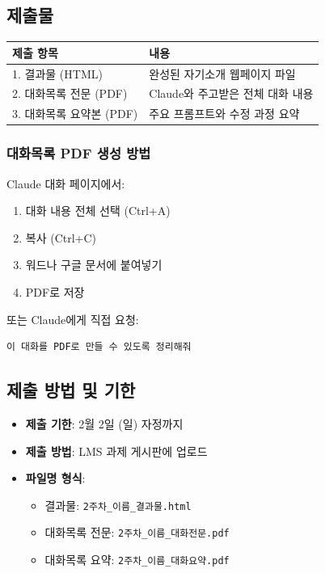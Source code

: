 \documentclass[11pt, a4paper]{article}
\begin{document}
\subsection{제출물}

\begin{table}[H]
\centering
\begin{tabularx}{\textwidth}{|l|X|}
\hline
\rowcolor{lightgray}
\textbf{제출 항목} & \textbf{내용} \\
\hline
1. 결과물 (HTML) & 완성된 자기소개 웹페이지 파일 \\
\hline
2. 대화목록 전문 (PDF) & Claude와 주고받은 전체 대화 내용 \\
\hline
3. 대화목록 요약본 (PDF) & 주요 프롬프트와 수정 과정 요약 \\
\hline
\end{tabularx}
\end{table}

\subsubsection{대화목록 PDF 생성 방법}

Claude 대화 페이지에서:
\begin{enumerate}
  \item 대화 내용 전체 선택 (Ctrl+A)
  \item 복사 (Ctrl+C)
  \item 워드나 구글 문서에 붙여넣기
  \item PDF로 저장
\end{enumerate}

또는 Claude에게 직접 요청:
\begin{verbatim}
이 대화를 PDF로 만들 수 있도록 정리해줘
\end{verbatim}

\subsection{제출 방법 및 기한}

\begin{itemize}
  \item \textbf{제출 기한}: 2월 2일 (일) 자정까지
  \item \textbf{제출 방법}: LMS 과제 게시판에 업로드
  \item \textbf{파일명 형식}:
  \begin{itemize}
    \item 결과물: \texttt{2주차\_이름\_결과물.html}
    \item 대화목록 전문: \texttt{2주차\_이름\_대화전문.pdf}
    \item 대화목록 요약: \texttt{2주차\_이름\_대화요약.pdf}
  \end{itemize}
\end{itemize}
\end{document}
